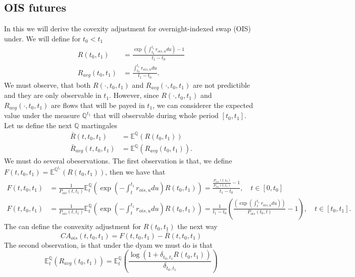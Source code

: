\documentclass[a4paper,10pt]{article}
\newcommand{\1}{\mathbf{1}}
\begin{document}
\newpage

\subsection{OIS futures}
In this we will derive the covexity adjustment for overnight-indexed swap (OIS) under. We will define for $t_0 < t_1$
\begin{align*}
R(t_0,t_1) &= \frac{\exp\left(\int_{t_0}^{t_1}r_{ois,u} du \right) - 1}{t_1 - t_0} \\
R_{avg}(t_0,t_1) &= \frac{\int_{t_0}^{t_1}r_{ois,u} du}{t_1 - t_0}.
\end{align*}
We must observe, that both $R(\cdot,t_0,t_1)$ and $R_{avg}(\cdot,t_0,t_1)$  are not predictible and they are only observable in $t_1$. However, since
$R(\cdot,t_0,t_1)$ and $R_{avg}(\cdot,t_0,t_1)$ are flows that will be payed in $t_1$, we can considerer the expected value under the measure $\mathbb{Q}^{t_1}$ that will observable during whole period $[t_0, t_1]$. Let us define the next $\mathbb{Q}$ martingales  
\begin{align*} 
\bar{R}(t,t_0,t_1) &= \mathbb{E}^{\mathbb{Q}}\left( R(t_0,t_1)  \right) \\
\bar{R}_{avg}(t,t_0,t_1) &= \mathbb{E}^{\mathbb{Q}}\left( R_{avg}(t_0,t_1)  \right).
\end{align*}
We must do several obeservations. The first observation is that, we define $F(t,t_0,t_1) = \mathbb{E}^{\mathbb{Q}^{t_1}}\left( R(t_0,t_1)\right)$, then we have that
\begin{align*}
F(t,t_0,t_1)&= \frac{1}{P_{ois}(t,t_1)}  \mathbb{E}_{t}^{\mathbb{Q}}\left(\exp\left(-\int_{t}^{t_1} r_{ois,u} du \right) R(t_0,t_1) \right) = \frac{\frac{P_{ois}(t,t_0)}{P_{ois}(t,t_1)} - 1}{t_1 - t_0}, \quad t \in [0,t_0] \\
F(t,t_0,t_1)&= \frac{1}{P_{ois}(t,t_1)} \mathbb{E}_{t}^{\mathbb{Q}}\left(\exp\left(-\int_{t}^{t_1} r_{ois,u} du \right) R(t_0,t_1) \right) = \frac{1}{t_1 - t_0} \left(\frac{\left( \exp\left(\int_{t}^{t_1}r_{ois,u} du\right)\right)}{P_{ois}(t_0,t)}-1\right), \quad  t \in  [t_0, t_1].
\end{align*}
The can define the convexity adjustment for $ R(t_0,t_1)$ the next way
\begin{equation}\label{R_ois_ca}
CA_{ois}(t,t_0,t_1) = F(t,t_0,t_1) - \bar{R}(t,t_0,t_1) 
\end{equation}
The second observation, is that under the dyam we must do is that
\begin{equation}\label{R_ois_avg}
\mathbb{E}_{t}^{\mathbb{Q}}\left(R_{avg}(t_0,t_1) \right) = \mathbb{E}_t^{\mathbb{Q}}\left( \frac{\log\left(1+ \delta_{t_0,t_1} R(t_0,t_1) \right)}{\delta_{t_0,t_1}} \right)  
\end{equation}
\end{document}
